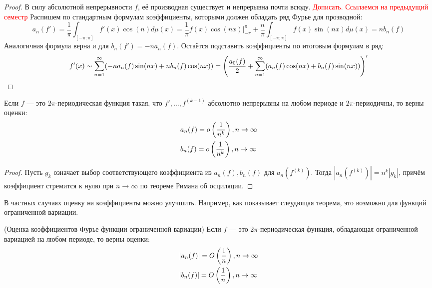 \begin{proof}
	В силу абсолютной непрерывности $f$, её производная существует и непрерывна почти всюду. \textcolor{red}{Дописать. Ссылаемся на предыдущий семестр} Распишем по стандартным формулам коэффициенты, которыми должен обладать ряд Фурье для прозводной:
	\[
		a_n(f') = \frac{1}{\pi} \int_{[-\pi; \pi]} f'(x)\cos(n)d\mu(x) = \frac{1}{\pi} f(x)\cos(nx)|_{-\pi}^\pi + \frac{n}{\pi} \int_{[-\pi; \pi]} f(x)\sin(nx)d\mu(x) = nb_n(f)
	\]
	Аналогичная формула верна и для $b_n(f') = -na_n(f)$. Остаётся подставить коэффициенты по итоговым формулам в ряд:
	\[
		f'(x) \sim \sum_{n = 1}^\infty (-na_n(f)\sin(nx) + nb_n(f)\cos(nx)) = \left(\frac{a_0(f)}{2} + \sum_{n = 1}^\infty (a_n(f)\cos(nx) + b_n(f)\sin(nx))\right)'
	\]
\end{proof}

\begin{corollary}
	Если $f$ --- это $2\pi$-периодическая функция такая, что $f', \ldots, f^{(k - 1)}$ абсолютно непрерывны на любом периоде и $2\pi$-периодичны, то верны оценки:
	\begin{align*}
		&{a_n(f) = o\left(\frac{1}{n^k}\right), n \to \infty}
		\\
		&{b_n(f) = o\left(\frac{1}{n^k}\right), n \to \infty}
	\end{align*}
\end{corollary}

\begin{proof}
	Пусть $g_k$ означает выбор соответствующего коэффициента из $a_n(f), b_n(f)$ для $a_n(f^{(k)})$. Тогда $|a_n(f^{(k)})| = n^k |g_k|$, причём коэффициент стремится к нулю при $n \to \infty$ по теореме Римана об осциляции.
\end{proof}

\begin{note}
	В частных случаях оценку на коэффициенты можно улучшить. Например, как показывает слеудющая теорема, это возможно для функций ограниченной вариации.
\end{note}

\begin{theorem} (Оценка коэффициентов Фурье функции ограниченной вариации)
	Если $f$ --- это $2\pi$-периодическая функция, обладающая ограниченной вариацией на любом периоде, то верны оценки:
	\begin{align*}
		&{|a_n(f)| = O\left(\frac{1}{n}\right), n \to \infty}
		\\
		&{|b_n(f)| = O\left(\frac{1}{n}\right), n \to \infty}
	\end{align*}
\end{theorem}

